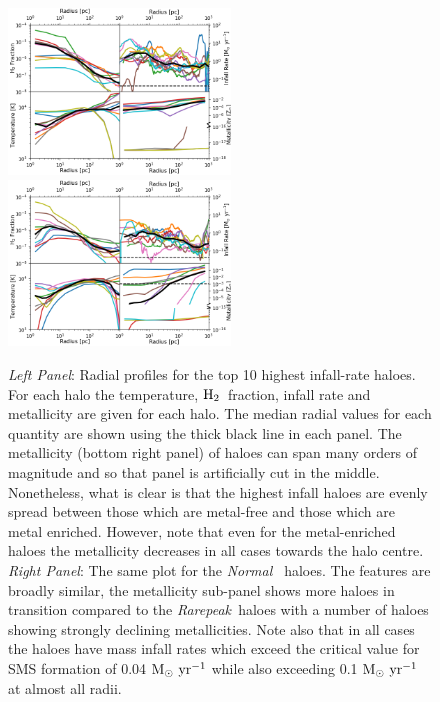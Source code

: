 \documentclass[twocolumn,iop,revtex4]{openjournal}
\newcommand{\msolaryr} {$\rm{M_{\odot}~yr^{-1}}~$}
\newcommand{\molH} {$\rm{H_2}$~}
\newcommand{\rarepeak} {\textit{Rarepeak~}}
\newcommand{\normal} {\textit{Normal~}}
\begin{document}
\begin{figure} [!t]
\centering
\begin{minipage}{175mm}      \begin{center} 
\centerline{
\includegraphics[width=0.525\textwidth]{FIGURES/MultiPlot_Rarepeak.png}
\includegraphics[width=0.525\textwidth]{FIGURES/MultiPlot_Normal.png}}
\caption{\textit{Left Panel}: Radial profiles for the top 10 highest infall-rate haloes. For
  each halo the temperature, \molH fraction, infall rate and metallicity are given for
  each halo. The median radial values for each quantity are shown using the
  thick black line in each panel. The metallicity (bottom right panel) of haloes can span many
  orders of magnitude and so that panel is artificially cut in the middle. Nonetheless, what is
  clear is that the highest infall haloes are evenly spread between those which are metal-free and
  those which are metal enriched. However, note that even for the metal-enriched haloes the
  metallicity decreases in all cases towards the halo centre. 
  \textit{Right Panel}: The same plot for the \normal
  haloes. The features are broadly similar, the metallicity sub-panel shows more haloes in transition
  compared to the \rarepeak haloes with a number of haloes showing strongly declining metallicities.
  Note also that in all cases the haloes have mass infall rates which exceed the critical value
  for SMS formation of 0.04 \msolaryr while also exceeding 0.1 \msolaryr at almost all radii.
} \label{Fig:RadialProfiles}
\end{center} \end{minipage}

\end{figure}
\end{document}
